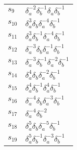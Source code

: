 \documentclass{article}
\begin{document}
\begin{center}
\begin{tabular}{ll}
$s_{9}$ & $\delta_a^{-2}\delta_b^{-1}\delta_a^{}\delta_b^{-1}$ \\
$s_{10}$ & $\delta_a^{3}\delta_b^{}\delta_a^{-4}\delta_b^{-1}$ \\
$s_{11}$ & $\delta_a^{3}\delta_b^{-1}\delta_a^{-4}\delta_b^{-1}$ \\
$s_{12}$ & $\delta_a^{-3}\delta_b^{}\delta_a^{-1}\delta_b^{-1}$ \\
$s_{13}$ & $\delta_a^{-3}\delta_b^{-1}\delta_a^{-2}\delta_b^{-1}$ \\
$s_{14}$ & $\delta_a^{4}\delta_b^{}\delta_a^{-2}\delta_b^{-1}$ \\
$s_{15}$ & $\delta_a^{4}\delta_b^{-1}\delta_a^{4}\delta_b^{-1}$ \\
$s_{16}$ & $\delta_a^{-4}\delta_b^{}\delta_a^{-3}\delta_b^{-1}$ \\
$s_{17}$ & $\delta_a^{-4}\delta_b^{-2}$ \\
$s_{18}$ & $\delta_a^{5}\delta_b^{}\delta_a^{-5}\delta_b^{-1}$ \\
$s_{19}$ & $\delta_a^{5}\delta_b^{-1}\delta_a^{-3}\delta_b^{-1}$ \\
\bottomrule
\end{tabular}
\end{center}

\thispagestyle{empty}
\end{document}
